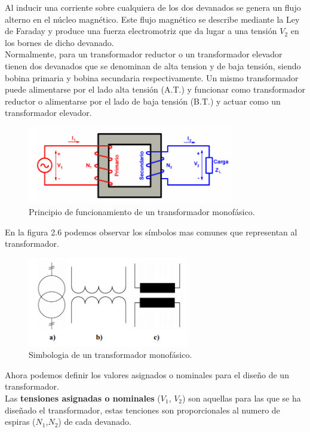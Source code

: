 Al inducir una corriente sobre cualquiera de los dos devanados se genera un flujo alterno en el núcleo magnético. Este flujo magnético se describe mediante la Ley de Faraday\cite{librotra} y produce una fuerza electromotriz que da lugar a una tensión $V_{2}$ en los bornes de dicho devanado.\\

Normalmente, para un transformador reductor o un transformador elevador tienen dos devanados que se denominan de alta tension y de baja tensión, siendo bobina primaria y bobina secundaria respectivamente. Un mismo transformador puede alimentarse por el lado alta tensión (A.T.) y funcionar como transformador reductor o alimentarse por el lado de baja tensión (B.T.) y actuar como un transformador elevador.

\begin{figure}[H]
\centering
\includegraphics[width=9cm]{capitulo3/figs/trans.png}
\caption{ Principio de funcionamiento de un transformador monofásico. \cite{transformador}}
\end{figure}

En la figura 2.6 podemos observar los símbolos mas comunes que representan al transformador. 

\begin{figure}[H]
\centering
\includegraphics[width=7cm]{capitulo3/figs/simbolos.png}
\caption{ Simbologia de un transformador monofásico.}
\end{figure}

Ahora podemos definir los valores asignados o nominales para el diseño de un transformador.\\

Las \textbf{tensiones asignadas o nominales} ($V_{1}$, $V_{2}$) son aquellas para las que se ha diseñado el transformador, estas tenciones son proporcionales al numero de espiras ($N_{1}$,$N_{2}$) de cada devanado.\\

